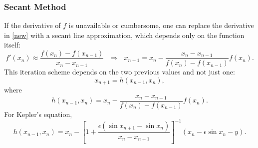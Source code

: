 \documentclass[10pt]{article}
\begin{document}
\subsubsection{Secant Method}
\noindent If the derivative of $f$ is unavailable or cumbersome, one can replace the derivative in \ref{new} with a secant line approximation, which depends only on the function itself:
\begin{equation*}
f'\left(x_n\right) \approx \frac{f\left(x_{n}\right)-f\left(x_{n-1}\right)}{x_{n}-x_{n-1}} \ \ \ \Rightarrow \ \ \ x_{n+1} = x_n - \frac{x_n-x_{n-1}}{f\left(x_n\right)-f\left(x_{n-1}\right)} f\left(x_n\right).
\end{equation*}
\noindent This iteration scheme depends on the two previous values and not just one:
\begin{equation*}
x_{n+1} = h\left(x_{n-1},x_n\right),
\end{equation*}
\noindent where
\begin{equation*}
h\left(x_{n-1},x_n\right) = x_n - \frac{x_n-x_{n-1}}{f\left(x_n\right)-f\left(x_{n-1}\right)} f\left(x_n\right).
\end{equation*}
\noindent For Kepler's equation,
\begin{equation*}
h\left(x_{n-1},x_n\right) = x_n - \left[1  + \frac{\epsilon \left(\sin x_{n+1}-  \sin x_n \right)}{x_n - x_{n+1}}\right]^{-1} \left(x_n - \epsilon \sin x_n - y\right).
\end{equation*}
\end{document}

